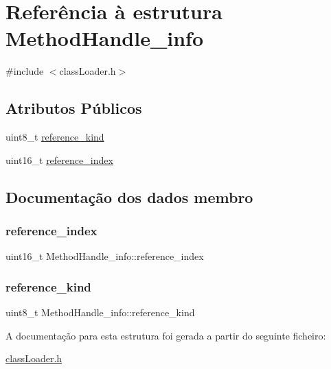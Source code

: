 \hypertarget{struct_method_handle__info}{}\section{Referência à estrutura Method\+Handle\+\_\+info}
\label{struct_method_handle__info}


{\ttfamily \#include $<$class\+Loader.\+h$>$}

\subsection*{Atributos Públicos}
\begin{DoxyCompactItemize}
\item 
uint8\+\_\+t \hyperlink{struct_method_handle__info_a2f1608061032e920d9acb620cb398b1d}{reference\+\_\+kind}
\item 
uint16\+\_\+t \hyperlink{struct_method_handle__info_a299e4a19a20107f04370e2760541920b}{reference\+\_\+index}
\end{DoxyCompactItemize}


\subsection{Documentação dos dados membro}
\hypertarget{struct_method_handle__info_a299e4a19a20107f04370e2760541920b}{}\label{struct_method_handle__info_a299e4a19a20107f04370e2760541920b} 
\subsubsection{\texorpdfstring{reference\+\_\+index}{reference\_index}}
{\footnotesize\ttfamily uint16\+\_\+t Method\+Handle\+\_\+info\+::reference\+\_\+index}

\hypertarget{struct_method_handle__info_a2f1608061032e920d9acb620cb398b1d}{}\label{struct_method_handle__info_a2f1608061032e920d9acb620cb398b1d} 
\subsubsection{\texorpdfstring{reference\+\_\+kind}{reference\_kind}}
{\footnotesize\ttfamily uint8\+\_\+t Method\+Handle\+\_\+info\+::reference\+\_\+kind}



A documentação para esta estrutura foi gerada a partir do seguinte ficheiro\+:\begin{DoxyCompactItemize}
\item 
\hyperlink{class_loader_8h}{class\+Loader.\+h}\end{DoxyCompactItemize}
